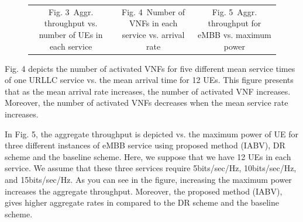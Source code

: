 \documentclass[lettersize,journal]{IEEEtran}
\begin{document}
\begin{figure}[!htb]
{\begin{tabular}{c@{}c@{}c}
			\scriptsize Fig. 3~Aggr. throughput vs. number of UEs in each service & \scriptsize  Fig. 4~Number of VNFs in each service vs. arrival rate & \scriptsize Fig. 5~Aggr. throughput for eMBB vs. maximum  power 
	\end{tabular}}
	\label{label}
	\vspace*{-3mm}
\end{figure}

Fig. 4 depicts the number of activated VNFs for five different mean service times of one URLLC service vs. the mean arrival time for 12 UEs. This figure presents that as the mean arrival rate increases, the number of activated VNF increases. Moreover, the number of activated VNFs decreases when the mean service rate increases.


In Fig. 5, the aggregate throughput is depicted vs. the maximum power of UE for three different instances of eMBB service using proposed method (IABV), DR scheme and the baseline scheme. Here, we suppose that we have 12 UEs in each service.  We assume that these three services require 5bits/sec/Hz, 10bits/sec/Hz, and 15bits/sec/Hz.
As you can see in the figure, increasing the maximum power increases the aggregate throughput. Moreover, the proposed method (IABV), gives higher aggregate rates in compared to the DR scheme and the baseline scheme.
\end{document}
